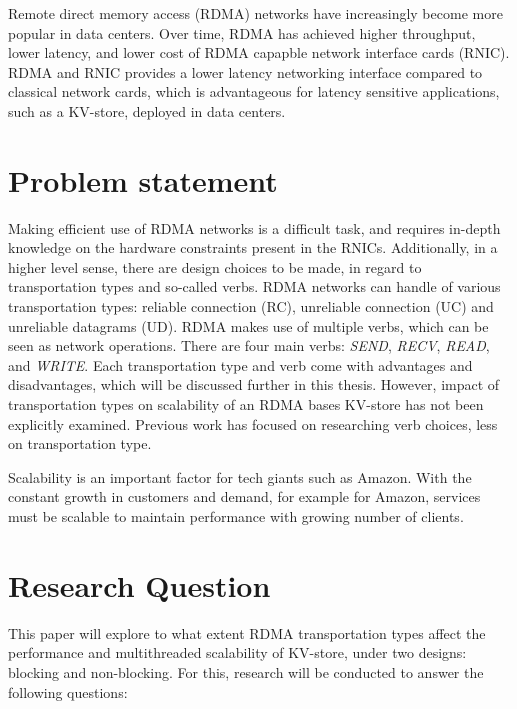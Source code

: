 Remote direct memory access (RDMA) networks have increasingly become more popular in data centers.
Over time, RDMA has achieved higher throughput, lower latency, and lower cost of RDMA capapble network interface cards (RNIC)\cite{kalia2016design, chen2019scalable}.
RDMA and RNIC provides a lower latency networking interface compared to classical network cards, which is advantageous for latency sensitive applications, such as a KV-store, deployed in data centers.


\section{Problem statement}
Making efficient use of RDMA networks is a difficult task, and requires in-depth knowledge on the hardware constraints present in the RNICs\cite{kalia2016design, chen2019scalable}.
Additionally, in a higher level sense, there are design choices to be made, in regard to transportation types and so-called verbs.
RDMA networks can handle of various transportation types: reliable connection (RC), unreliable connection (UC) and unreliable datagrams (UD).
RDMA makes use of multiple verbs, which can be seen as network operations.
There are four main verbs: \textit{SEND}, \textit{RECV}, \textit{READ}, and \textit{WRITE}.
Each transportation type and verb come with advantages and disadvantages, which will be discussed further in this thesis.
However, impact of transportation types on scalability of an RDMA bases KV-store has not been explicitly examined.
Previous work has focused on researching verb choices, less on transportation type\cite{kalia2014using, kalia2016fasst, mitchell2013using}.

Scalability is an important factor for tech giants such as Amazon.
With the constant growth in customers and demand, for example for Amazon, services must be scalable to maintain performance with growing number of clients.

\section{Research Question}
This paper will explore to what extent RDMA transportation types affect the performance and multithreaded scalability of KV-store, under two designs: blocking and non-blocking.
For this, research will be conducted to answer the following questions:

